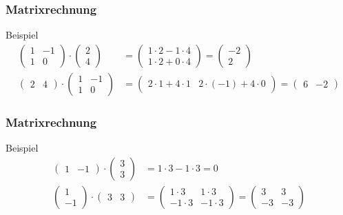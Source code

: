 \documentclass{beamer}
\newcommand{\mytitle}{Matrixrechnung}
\begin{document}
\begin{frame}\frametitle{\mytitle}
	\begin{block}{Beispiel}
		\begin{align*}
			\begin{pmatrix} 1&-1\\1&0\end{pmatrix}\cdot	
			\begin{pmatrix} 2\\4\end{pmatrix}
							 &=
			\begin{pmatrix}1\cdot 2-1\cdot4\\1\cdot 2+0\cdot 4\end{pmatrix}=
				\begin{pmatrix} -2\\2\end{pmatrix}\\
			\begin{pmatrix} 2&4\end{pmatrix}\cdot	
			\begin{pmatrix} 1&-1\\1&0\end{pmatrix}
							 &=
							 \begin{pmatrix}2\cdot 1+4\cdot1&2\cdot (-1)+4\cdot 0\end{pmatrix}=
							 \begin{pmatrix}6&-2\end{pmatrix}
		\end{align*}
	\end{block}
\end{frame}

\begin{frame}\frametitle{\mytitle}
	\begin{block}{Beispiel}
		\begin{align*}
			\begin{pmatrix} 1&-1 \end{pmatrix}\cdot \begin{pmatrix} 3\\3 \end{pmatrix}&=1\cdot 3-1\cdot 3=0\\
			\begin{pmatrix} 1\\-1 \end{pmatrix}\cdot \begin{pmatrix} 3&3 \end{pmatrix}&=
			\begin{pmatrix} 1\cdot 3&1\cdot 3\\-1\cdot 3&-1\cdot 3 \end{pmatrix} 
			=		\begin{pmatrix} 3&3\\-3&-3 \end{pmatrix} 
		\end{align*}
	\end{block}
\end{frame}
\end{document}
